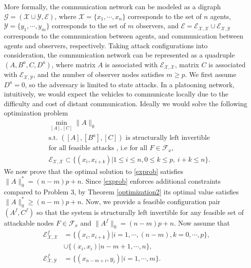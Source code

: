 \documentclass[letterpaper, 10 pt, conference]{ieeeconf}
\begin{document}
More formally, the communication network can be modeled as a digraph $\mathcal{G}=(\mathcal X \cup \mathcal Y,\mathcal E)$, where $\mathcal X=\{x_1,\cdots,x_n\}$ corresponds to the set of $n$ agents, $\mathcal Y=\{y_1,\cdots,y_m\}$  corresponds to the set of $m$ observers, and $\mathcal E=\mathcal E_{\mathcal X,\mathcal X}\cup \mathcal E_{\mathcal X,\mathcal Y}$ corresponds to the communication between agents, and communication between agents and observers, respectively. Taking attack configurations into consideration, the communication network can be represented as a quadruple $(A,B^a,C,D^a)$, where matrix $A$ is associated with $\mathcal E_{\mathcal X,\mathcal X}$, matrix $C$ is associated with $\mathcal E_{\mathcal X,\mathcal Y}$, and the number of observer nodes satisfies $m\geq p$. We first assume $D^a = 0$, so the adversary is limited to state attacks. In a platooning network, intuitively, we would expect the vehicles to communicate locally due to the difficulty and cost of distant communication. Ideally we would solve the following optimization problem
\begin{align}
 & \underset{[A],[C]}{\min}  \| A \|_0 \label{exprob} \\
 & \mbox{s.t. } ([A],[B^a],[C]) \mbox{ is structurally left invertible} \nonumber \\ 
 &\mbox{for all feasible attacks , i.e for all }F \in \mathcal{F}_x,\nonumber \\
 & \mathcal E_{\mathcal X,\mathcal X}\subset \{(x_i,x_{i+k})|1 \le i \le n, 0 \le k \le p,~i+k\leq n\}. \nonumber
\end{align}
We now prove that the optimal solution to \eqref{exprob} satisfies $\|A\|_0^* =  (n-m)p+n$. Since \eqref{exprob} enforces additional constraints compared to Problem 3, by Theorem \ref{optimization2} its optimal value satisfies $\| A \|_0^* \ge (n-m)p+n$. Now, we provide a feasible configuration pair $(A^f,C^f)$ so that the system is structurally left invertible for any feasible set of attackable nodes $F \in \mathcal{F}_x$ and $\|A^f\|_0=(n-m)p+n$. Now assume that
\begin{align*}
\mathcal E^f_{\mathcal X,\mathcal X} &=\{(x_i,x_{i+k})|i=1,\cdots,(n-m),k=0,\cdots,p\}, \\
& \cup \{(x_i,x_i)| n-m+1, \cdots, n\}, \\
\mathcal E^f_{\mathcal X,\mathcal Y} &=\{(x_{n-m+i},y_i)|i=1,\cdots,m\}.
\end{align*}
\end{document}
